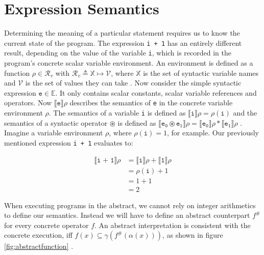 \section{Expression Semantics}

Determining the meaning of a particular statement requires us to know the current state of the program. The expression \texttt{i + 1} has an entirely different result, depending on the value of the variable \texttt{i}, which is recorded in the program's concrete scalar variable environment. An environment is defined as a function $\rho\in\mathcal{R}_v$ with $\mathcal{R}_v \triangleq \mathbb{X}\mapsto\mathcal{V}$, where $\mathbb{X}$ is the set of syntactic variable names and $\mathcal{V}$ is the set of values they can take \cite{cousot2011}.
Now consider the simple syntactic expression $\mathtt{e}\in\mathbb{E}$. It only contains scalar constants, scalar variable references and operators. Now $\llbracket\mathtt{e}\rrbracket\rho$ describes the semantics of \texttt{e} in the concrete variable environment $\rho$. The semantics of a variable \texttt{i} is defined as $\llbracket\mathtt{i}\rrbracket\rho=\rho(\mathtt{i})$ and the semantics of a syntactic operator $\circledast$ is defined as $\llbracket\mathtt{e_0\circledast e_1}\rrbracket\rho=\llbracket\mathtt{e_0}\rrbracket\rho \ast\llbracket\mathtt{e_1}\rrbracket\rho$ \cite{scott1971}. 
Imagine a variable environment $\rho$, where $\rho(\mathtt{i})=1$, for example. Our previously mentioned expression \texttt{i + 1} evaluates to:

\begin{equation*}
\begin{aligned}
\llbracket\mathtt{i \;\texttt{+}\; 1}\rrbracket\rho &=\llbracket\mathtt{i}\rrbracket\rho +\llbracket\mathtt{1}\rrbracket\rho \\
& = \rho(\mathtt{i}) + 1\\
& = 1+1\\
& = 2
\end{aligned}
\end{equation*}
\vspace{1mm}

\noindent When executing programs in the abstract, we cannot rely on integer arithmetics to define our semantics. Instead we will have to define an abstract counterpart $f^\#$ for every concrete operator $f$. An abstract interpretation is consistent with the concrete execution, iff $f(x)\subseteq\gamma(f^\#(\alpha(x)))$, as shown in figure \ref{fig:abstractfunction} \cite{cousot1977}.

